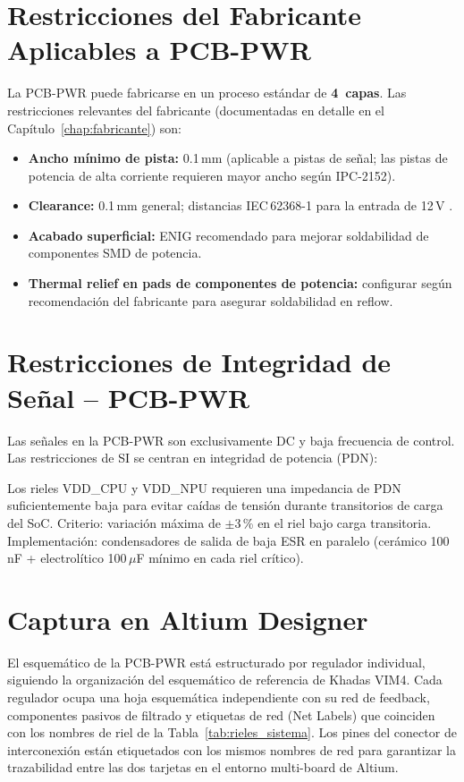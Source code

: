 \section{Restricciones del Fabricante Aplicables a PCB-PWR}
\label{sec:pwr_fabricante}

La PCB-PWR puede fabricarse en un proceso estándar de \textbf{4~capas}. Las
restricciones relevantes del fabricante (documentadas en detalle en el
Capítulo~\ref{chap:fabricante}) son:

\begin{fabbox}
  \begin{itemize}
    \item \textbf{Ancho mínimo de pista:} 0.1\,mm (aplicable a pistas de señal;
      las pistas de potencia de alta corriente requieren mayor ancho según IPC-2152).
    \item \textbf{Clearance:} 0.1\,mm general; distancias IEC\,62368-1 para la
      entrada de 12\,V .
    \item \textbf{Acabado superficial:} ENIG recomendado para mejorar soldabilidad
      de componentes SMD de potencia.
    \item \textbf{Thermal relief en pads de componentes de potencia:} configurar
      según recomendación del fabricante para asegurar soldabilidad en reflow.
  \end{itemize}
\end{fabbox}

\section{Restricciones de Integridad de Señal -- PCB-PWR}
\label{sec:pwr_si}

Las señales en la PCB-PWR son exclusivamente DC y baja frecuencia de control.
Las restricciones de SI se centran en integridad de potencia (PDN):

\begin{sibox}
  Los rieles VDD\_CPU y VDD\_NPU requieren una impedancia de PDN suficientemente baja
  para evitar caídas de tensión durante transitorios de carga del SoC.
  Criterio: variación máxima de $\pm$3\,\% en el riel bajo carga transitoria.
  Implementación: condensadores de salida de baja ESR en paralelo (cerámico 100\,nF
  + electrolítico 100\,$\mu$F mínimo en cada riel crítico).
\end{sibox}

\section{Captura en Altium Designer}
\label{sec:pwr_altium}

El esquemático de la PCB-PWR está estructurado por regulador individual, siguiendo
la organización del esquemático de referencia de Khadas VIM4. Cada regulador ocupa
una hoja esquemática independiente con su red de feedback, componentes pasivos de
filtrado y etiquetas de red (Net Labels) que coinciden con los nombres de riel de
la Tabla~\ref{tab:rieles_sistema}. Los pines del conector de interconexión
están etiquetados con los mismos nombres de red para garantizar la trazabilidad
entre las dos tarjetas en el entorno multi-board de Altium.
